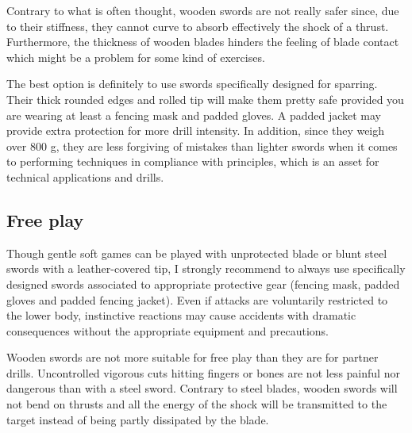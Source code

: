 Contrary to what is often thought, wooden swords are not really safer since, due to their stiffness, they cannot curve to absorb effectively the shock of a thrust.
Furthermore, the thickness of wooden blades hinders the feeling of blade contact which might be a problem for some kind of exercises.

The best option is definitely to use swords specifically designed for sparring. Their thick rounded edges and rolled tip will make them pretty safe provided you are wearing at least a fencing mask and padded gloves. A padded jacket may provide extra protection for more drill intensity. In addition, since they weigh over 800 g, they are less forgiving of mistakes than lighter swords when it comes to performing techniques in compliance with principles, which is an asset for technical applications and drills. 



\subsection{Free play}
Though gentle soft games can be played with unprotected blade or blunt steel swords with a leather-covered tip, I strongly recommend to always use specifically designed swords associated to appropriate protective gear (fencing mask, padded gloves and padded fencing jacket).
Even if attacks are voluntarily restricted to the lower body, instinctive reactions may cause accidents with dramatic consequences without the appropriate equipment and precautions.

Wooden swords are not more suitable for free play than they are for partner drills. Uncontrolled vigorous cuts hitting fingers or bones are not less painful nor dangerous than with a steel sword. Contrary to steel blades, wooden swords will not bend on thrusts and all the energy of the shock will be transmitted to the target instead of being partly dissipated by the blade.

